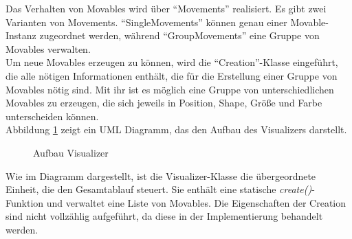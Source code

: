 \documentclass[11pt,a4paper]{article}
\begin{document}
Das Verhalten von Movables wird über ``Movements'' realisiert. Es gibt zwei Varianten von Movements. ``SingleMovements'' können genau einer Movable-Instanz zugeordnet werden, während ``GroupMovements'' eine Gruppe von Movables verwalten.\\
Um neue Movables erzeugen zu können, wird die ``Creation''-Klasse eingeführt, die alle nötigen Informationen enthält, die für die Erstellung einer Gruppe von Movables nötig sind. Mit ihr ist es möglich eine Gruppe von unterschiedlichen Movables zu erzeugen, die sich jeweils in Position, Shape, Größe und Farbe unterscheiden können.\\
Abbildung \ref{fig:AufbauVisualizer} zeigt ein UML Diagramm, das den Aufbau des Visualizers darstellt.\\

\begin{figure}[!ht]
\centering
{}
\caption[Aufbau Visualizer]{Aufbau Visualizer}
\label{fig:AufbauVisualizer}
\end{figure}
\noindent
Wie im Diagramm dargestellt, ist die Visualizer-Klasse die übergeordnete Einheit, die den Gesamtablauf steuert. Sie enthält eine statische \textit{create()}-Funktion und verwaltet eine Liste von Movables. Die Eigenschaften der Creation sind nicht vollzählig aufgeführt, da diese in der Implementierung behandelt werden.
\end{document}
